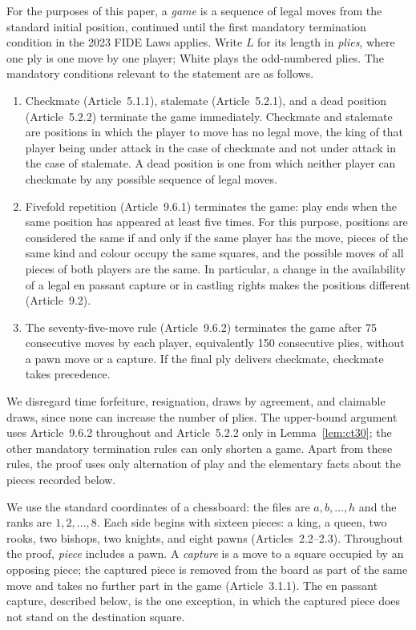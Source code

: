 \documentclass[11pt]{article}
\theoremstyle{definition}
\begin{document}
For the purposes of this paper, a \emph{game} is a sequence of legal moves from
the standard initial position, continued until the first mandatory termination
condition in the 2023 FIDE Laws applies. Write $L$ for its length in
\emph{plies}, where one ply is one move by one player; White plays the
odd-numbered plies. The mandatory conditions relevant to the statement are as
follows.

\begin{enumerate}
  \item Checkmate (Article~5.1.1), stalemate (Article~5.2.1), and a dead
    position (Article~5.2.2) terminate the game immediately. Checkmate and
    stalemate are positions in which the player to move has no legal move,
    the king of that player being under attack in the case of checkmate and
    not under attack in the case of stalemate. A dead position is one from
    which neither player can checkmate by any possible sequence of legal
    moves.
  \item Fivefold repetition (Article~9.6.1) terminates the game: play ends
    when the same position has appeared at least five times. For this
    purpose, positions are considered the same if and only if the same player
    has the move, pieces of the same kind and colour occupy the same squares,
    and the possible moves of all pieces of both players are the same. In
    particular, a change in the availability of a legal en passant capture or
    in castling rights makes the positions different (Article~9.2).
  \item The seventy-five-move rule (Article~9.6.2) terminates the game after
    75 consecutive moves by each player, equivalently 150 consecutive plies,
    without a pawn move or a capture. If the final ply delivers checkmate,
    checkmate takes precedence.
\end{enumerate}

We disregard time forfeiture, resignation, draws by agreement, and claimable
draws, since none can increase the number of plies. The upper-bound argument
uses Article~9.6.2 throughout and Article~5.2.2 only in
Lemma~\ref{lem:ct30}; the other mandatory termination rules can only shorten a
game. Apart from these rules, the proof uses only alternation of play and the
elementary facts about the pieces recorded below.

We use the standard coordinates of a chessboard: the files are
$a,b,\ldots,h$ and the ranks are $1,2,\ldots,8$. Each side begins with
sixteen pieces: a king, a queen, two rooks, two bishops, two knights, and
eight pawns (Articles~2.2--2.3). Throughout the proof, \emph{piece} includes
a pawn. A \emph{capture} is a move to a square occupied by an opposing
piece; the captured piece is removed from the board as part of the same
move and takes no further part in the game (Article~3.1.1). The en passant
capture, described below, is the one exception, in which the captured piece
does not stand on the destination square.
\end{document}
